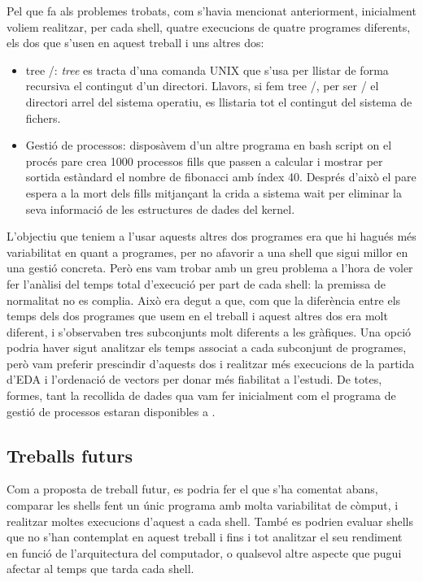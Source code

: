 \documentclass[12pt]{article}
\begin{document}
Pel que fa als problemes trobats, com s'havia mencionat anteriorment, inicialment voliem realitzar, per cada shell, quatre execucions de quatre programes diferents,
els dos que s'usen en aquest treball i uns altres dos:
\begin{itemize}
  \item tree /: \emph{tree} es tracta d'una comanda UNIX que s'usa per llistar de forma recursiva el contingut d'un directori. Llavors, si fem tree /, per ser / el directori
    arrel del sistema operatiu, es llistaria tot el contingut del sistema de fichers.
  \item Gestió de processos: disposàvem d'un altre programa en bash script on el procés pare crea 1000 processos fills que passen a calcular i mostrar per sortida estàndard 
    el nombre de fibonacci amb índex 40. Després d'això el pare espera a la mort dels fills mitjançant la crida a sistema wait per eliminar la seva informació de les 
    estructures de dades del kernel.
\end{itemize} 
L'objectiu que teniem a l'usar aquests altres dos programes era que hi hagués més variabilitat en quant a programes, per no afavorir a una shell que sigui millor en una gestió 
concreta. Però ens vam trobar amb un greu problema a l'hora de voler fer l'anàlisi del temps total d'execució per part de cada shell: la premissa de normalitat no es complia. Això
era degut a que, com que la diferència entre els temps dels dos programes que usem en el treball i aquest altres dos era molt diferent, i s'observaben tres subconjunts molt diferents 
a les gràfiques. Una opció podria haver sigut analitzar els temps associat a cada subconjunt de programes, però vam preferir prescindir d'aquests dos i realitzar més execucions
de la partida d'EDA i l'ordenació de vectors per donar més fiabilitat a l'estudi. De totes, formes, tant la recollida de dades qua vam fer inicialment com el programa de gestió
de processos estaran disponibles a .

\subsection{Treballs futurs}
Com a proposta de treball futur, es podria fer el que s'ha comentat abans, comparar les shells fent un únic programa amb molta variabilitat de còmput, i realitzar moltes
execucions d'aquest a cada shell. També es podrien evaluar shells que no s'han contemplat en aquest treball i fins i tot analitzar el seu rendiment en funció de l'arquitectura
del computador, o qualsevol altre aspecte que pugui afectar al temps que tarda cada shell.
\end{document}
